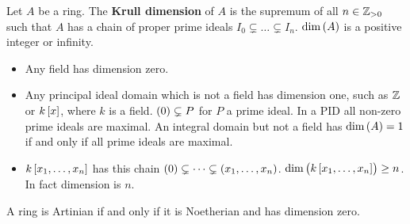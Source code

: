 \begin{definition}
Let $ A $ be a ring. The \textbf{Krull dimension} of $ A $ is the supremum of all $ n \in \mathbb{Z}_{> 0} $ such that $ A $ has a chain of proper prime ideals $ I_0 \subsetneq \dots \subsetneq I_n $. $ \dim\br{A} $ is a positive integer or infinity.
\end{definition}

\begin{example*}
\hfill
\begin{itemize}
\item Any field has dimension zero.
\item Any principal ideal domain which is not a field has dimension one, such as $ \mathbb{Z} $ or $ k\sbr{x} $, where $ k $ is a field. $ \br{0} \subsetneq P $ for $ P $ a prime ideal. In a PID all non-zero prime ideals are maximal. An integral domain but not a field has $ \dim\br{A} = 1 $ if and only if all prime ideals are maximal.
\item $ k\sbr{x_1, \dots, x_n} $ has this chain $ \br{0} \subsetneq \dots \subsetneq \br{x_1, \dots, x_n} $. $ \dim\br{k\sbr{x_1, \dots, x_n}} \ge n $. In fact dimension is $ n $.
\end{itemize}
\end{example*}

\begin{theorem}
A ring is Artinian if and only if it is Noetherian and has dimension zero.
\end{theorem}

